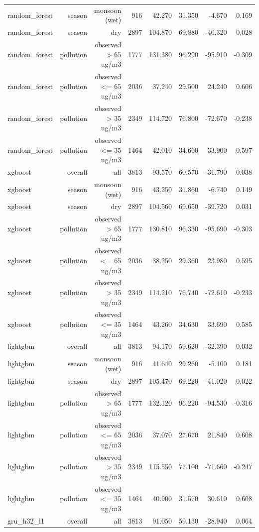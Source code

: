 \begin{table}[htbp]
\begin{tabular}{lrrrrrrr}
random\_forest & season & monsoon (wet) & 916 & 42.270 & 31.350 & -4.670 & 0.169 \\
random\_forest & season & dry & 2897 & 104.870 & 69.880 & -40.320 & 0.028 \\
random\_forest & pollution & observed > 65 ug/m3 & 1777 & 131.380 & 96.290 & -95.910 & -0.309 \\
random\_forest & pollution & observed <= 65 ug/m3 & 2036 & 37.240 & 29.500 & 24.240 & 0.606 \\
random\_forest & pollution & observed > 35 ug/m3 & 2349 & 114.720 & 76.800 & -72.670 & -0.238 \\
random\_forest & pollution & observed <= 35 ug/m3 & 1464 & 42.010 & 34.660 & 33.900 & 0.597 \\
xgboost & overall & all & 3813 & 93.570 & 60.570 & -31.790 & 0.038 \\
xgboost & season & monsoon (wet) & 916 & 43.250 & 31.860 & -6.740 & 0.149 \\
xgboost & season & dry & 2897 & 104.560 & 69.650 & -39.720 & 0.031 \\
xgboost & pollution & observed > 65 ug/m3 & 1777 & 130.810 & 96.330 & -95.690 & -0.303 \\
xgboost & pollution & observed <= 65 ug/m3 & 2036 & 38.250 & 29.360 & 23.980 & 0.595 \\
xgboost & pollution & observed > 35 ug/m3 & 2349 & 114.210 & 76.740 & -72.610 & -0.233 \\
xgboost & pollution & observed <= 35 ug/m3 & 1464 & 43.260 & 34.630 & 33.690 & 0.585 \\
lightgbm & overall & all & 3813 & 94.170 & 59.620 & -32.390 & 0.032 \\
lightgbm & season & monsoon (wet) & 916 & 41.640 & 29.260 & -5.100 & 0.181 \\
lightgbm & season & dry & 2897 & 105.470 & 69.220 & -41.020 & 0.022 \\
lightgbm & pollution & observed > 65 ug/m3 & 1777 & 132.120 & 96.220 & -94.530 & -0.316 \\
lightgbm & pollution & observed <= 65 ug/m3 & 2036 & 37.070 & 27.670 & 21.840 & 0.608 \\
lightgbm & pollution & observed > 35 ug/m3 & 2349 & 115.550 & 77.100 & -71.660 & -0.247 \\
lightgbm & pollution & observed <= 35 ug/m3 & 1464 & 40.900 & 31.570 & 30.610 & 0.608 \\
gru\_h32\_l1 & overall & all & 3813 & 91.050 & 59.130 & -28.940 & 0.064 \\

\end{tabular}
\end{table}
